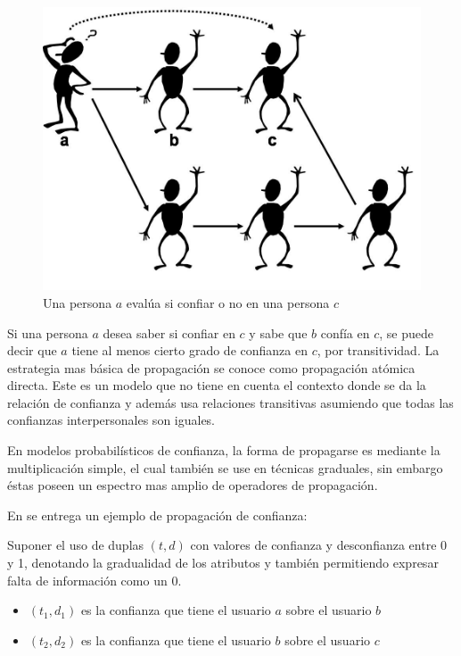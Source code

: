 \begin{figure}[hbtp]
\centering
\includegraphics[scale=0.3]{images/trustprop.png}
\caption{Una persona $a$ evalúa si confiar o no en una persona $c$}
\end{figure}

Si una persona $a$ desea saber si confiar en $c$ y sabe que $b$ confía en $c$, se puede decir que $a$ tiene al menos cierto grado de confianza en $c$, por transitividad. 
La estrategia mas básica de propagación se conoce como propagación atómica directa. Este es un modelo que no tiene en cuenta el contexto donde se da la relación de confianza y además usa relaciones transitivas asumiendo que todas las confianzas interpersonales son iguales. 

En modelos probabilísticos de confianza, la forma de propagarse es mediante la multiplicación simple, el cual también se use en técnicas graduales, sin embargo éstas poseen un espectro mas amplio de operadores de propagación. 

En \cite{Victor} se entrega un ejemplo de propagación de confianza:

Suponer el uso de duplas $(t,d)$ con valores de confianza y desconfianza entre 0 y 1, denotando la gradualidad de los atributos y también permitiendo expresar falta de información como un 0. 

\begin{itemize}
\item{$(t_1,d_1)$ es la confianza que tiene el usuario $a$ sobre el usuario $b$}
\item{$(t_2,d_2)$ es la confianza que tiene el usuario $b$ sobre el usuario $c$}
\end{itemize}

